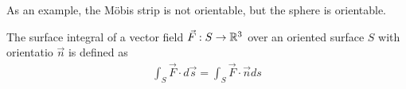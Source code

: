 As an example, the M\"obis strip is not orientable, but the sphere is orientable.

\begin{definition}
    The surface integral of a vector field $\vec{F}:S \to \mathbb{R}^{3}$ over an oriented surface $S$ with orientatio $\vec{n}$ is defined as
    \begin{align}
        \int_{S} \vec{F} \cdot d\vec{s} = \int_{S} \vec{F} \cdot \vec{n} ds
    \end{align}
\end{definition}